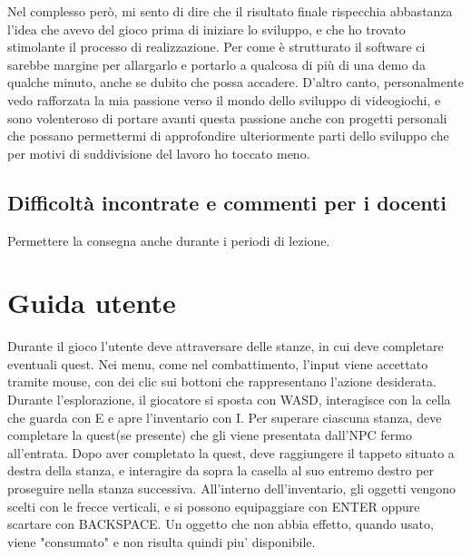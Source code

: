 \documentclass[a4paper,12pt]{report}
\begin{document}
\newline Nel complesso però, mi sento di dire che il risultato finale rispecchia abbastanza l'idea che avevo del gioco prima di iniziare lo sviluppo, e che ho trovato stimolante il processo di realizzazione. Per come è strutturato il software ci sarebbe margine per allargarlo e portarlo a qualcosa di più di una demo da qualche minuto, anche se dubito che possa accadere. D'altro canto, personalmente vedo rafforzata la mia passione verso il mondo dello sviluppo di videogiochi, e sono volenteroso di portare avanti questa passione anche con progetti personali che possano permettermi di approfondire ulteriormente parti dello sviluppo che per motivi di suddivisione del lavoro ho toccato meno.

\section{Difficoltà incontrate e commenti per i docenti}

Permettere la consegna anche durante i periodi di lezione.

\appendix
\chapter{Guida utente}

Durante il gioco l'utente deve attraversare delle stanze, in cui deve completare eventuali quest.
\newline Nei menu, come nel combattimento, l'input viene accettato tramite mouse, con dei clic sui bottoni che rappresentano l'azione desiderata.
\newline Durante l'esplorazione, il giocatore si sposta con WASD, interagisce con la cella che guarda con E e apre l'inventario con I.
\newline Per superare ciascuna stanza, deve completare la quest(se presente) che gli viene presentata dall'NPC fermo all'entrata. Dopo aver completato la quest, deve raggiungere il tappeto situato a destra della stanza, e interagire da sopra la casella al suo entremo destro per proseguire nella stanza successiva.
\newline All'interno dell'inventario, gli oggetti vengono scelti con le frecce verticali, e si possono equipaggiare con ENTER oppure scartare con BACKSPACE. Un oggetto che non abbia effetto, quando usato, viene "consumato" e non risulta quindi piu' disponibile.



\end{document}
